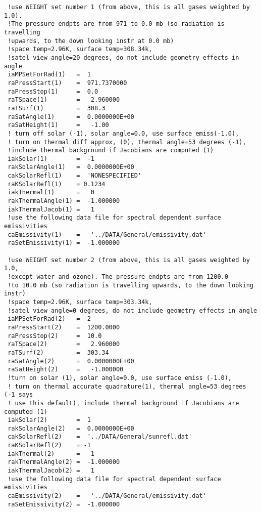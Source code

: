 \documentclass[12pt]{article}
\begin{document}
\begin{scriptsize}
\begin{verbatim}
 !use WEIGHT set number 1 (from above, this is all gases weighted by 1.0). 
 !The pressure endpts are from 971 to 0.0 mb (so radiation is travelling 
 !upwards, to the down looking instr at 0.0 mb)
 !space temp=2.96K, surface temp=308.34k, 
 !satel view angle=20 degrees, do not include geometry effects in angle
 iaMPSetForRad(1)   =  1
 raPressStart(1)    =  971.7370000
 raPressStop(1)     =  0.0
 raTSpace(1)        =   2.960000
 raTSurf(1)         =  308.3
 raSatAngle(1)      =  0.0000000E+00
 raSatHeight(1)     =   -1.00
 ! turn off solar (-1), solar angle=0.0, use surface emiss(-1.0),
 ! turn on thermal diff approx, (0), thermal angle=53 degrees (-1),
 !include thermal background if Jacobians are computed (1)
 iakSolar(1)        =  -1
 rakSolarAngle(1)   =  0.0000000E+00
 cakSolarRefl(1)    =  'NONESPECIFIED'
 raKSolarRefl(1)    = 0.1234
 iakThermal(1)      =   0
 rakThermalAngle(1) =  -1.000000
 iakThermalJacob(1) =   1
 !use the following data file for spectral dependent surface emissivities
 caEmissivity(1)    =   '../DATA/General/emissivity.dat'
 raSetEmissivity(1) =  -1.000000

 !use WEIGHT set number 2 (from above, this is all gases weighted by 1.0, 
 !except water and ozone). The pressure endpts are from 1200.0
 !to 10.0 mb (so radiation is travelling upwards, to the down looking instr)
 !space temp=2.96K, surface temp=303.34k, 
 !satel view angle=0 degrees, do not include geometry effects in angle 
 iaMPSetForRad(2)   =  2
 raPressStart(2)    =  1200.0000
 raPressStop(2)     =  10.0
 raTSpace(2)        =   2.960000
 raTSurf(2)         =  303.34
 raSatAngle(2)      =  0.0000000E+00
 raSatHeight(2)     =   -1.000000
 !turn on solar (1), solar angle=0.0, use surface emiss (-1.0),
 ! turn on thermal accurate quadrature(1), thermal angle=53 degrees (-1 says 
 ! use this default), include thermal background if Jacobians are computed (1)
 iakSolar(2)        =  1
 rakSolarAngle(2)   =  0.0000000E+00
 cakSolarRefl(2)    =  '../DATA/General/sunrefl.dat'
 raKSolarRefl(2)    = -1
 iakThermal(2)      =   1
 rakThermalAngle(2) =  -1.000000
 iakThermalJacob(2) =   1
 !use the following data file for spectral dependent surface emissivities
 caEmissivity(2)    =   '../DATA/General/emissivity.dat'
 raSetEmissivity(2) =  -1.000000


\end{verbatim}
\end{scriptsize}
\end{document}
